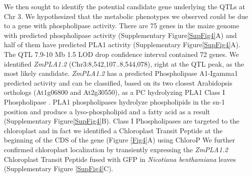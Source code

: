 \documentclass[9pt,twocolumn,twoside]{BioRxiv}
\begin{document}
We then sought to identify the potential candidate gene underlying the QTLs at Chr 3.
We hypothesized that the metabolic phenotypes we observed could be due to a gene with phospholipase activity. 
There are 75 genes in the maize genome with predicted phospholipase activity (Supplementary Figure\ref{SupFig4}A) and half of them have predicted PLA1 activity (Supplementary Figure\ref{SupFig4}A).  
The QTL 7.9-10 Mb 1.5 LOD drop confidence interval contained 72 genes. 
We identified \textit{ZmPLA1.2} (Chr3:8,542,107..8,544,078), right at the QTL peak, as the most likely candidate. 
\textit{ZmPLA1.2} has a predicted Phospholipase A1-Igamma1 predicted activity and can be classified, based on its two closest Arabidopsis orthologs (At1g06800 and At2g30550), as a PC hydrolyzing PLA1 Class I Phospholipase \cite{Ryu2004-iv}. 
PLA1 phospholipases hydrolyze phospholipids in the sn-1 position and produce a lyso-phospholipid and a fatty acid as a result (Supplementary Figure\ref{SupFig4}B). 
Class I Phospholipases are targeted to the chloroplast and in fact we identified a Chloroplast Transit Peptide at the beginning of the CDS of the gene (Figure \ref{Fig4}A) using ChloroP \cite{Emanuelsson1999-rs} 
We further confirmed chloroplast localization by transiently expressing  the \textit{ZmPLA1.2} Chloroplast Transit Peptide fused with GFP in \textit{Nicotiana benthamiana} leaves (Supplementary Figure \ref{SupFig4}C).
\end{document}
